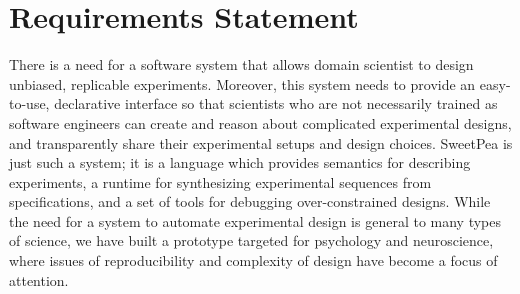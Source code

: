 \section{Requirements Statement}

There is a need for a software system that allows domain scientist to design unbiased, replicable experiments. Moreover, this system needs to provide an easy-to-use, declarative interface so that scientists who are not necessarily trained as software engineers can create and reason about complicated experimental designs, and transparently share their experimental setups and design choices. SweetPea is just such a system; it is a language which provides semantics for describing experiments, a runtime for synthesizing experimental sequences from specifications, and a set of tools for debugging over-constrained designs. While the need for a system to automate experimental design is general to many types of science, we have built a prototype targeted for psychology and neuroscience, where issues of reproducibility and complexity of design have become a focus of attention.




